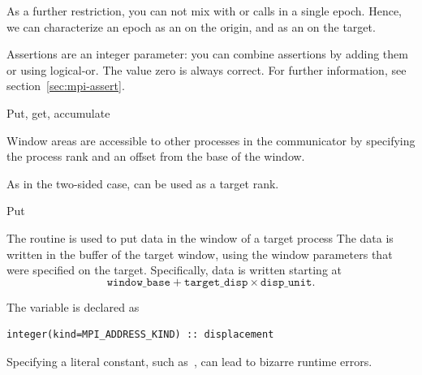 As a further restriction, you can not mix  with  or 
calls in a single epoch. Hence, we can characterize an epoch as an
 on the origin, and
as an  on the target.

Assertions are an integer parameter: you can combine assertions by
adding them or using logical-or.
The value zero is always correct. For further information, see
section~\ref{sec:mpi-assert}.



 {Put, get, accumulate}
\label{sec:putget}

Window areas are 
accessible to other processes in the communicator by specifying the
process rank and an offset from the base of the window.

As in the two-sided case,  can be used as
a target rank.

 {Put}

The  routine is used to put data in the window
of a target process
%
%
The data is written in the buffer of the target window,
using the window parameters that were specified on the target.
Specifically, data is written starting at
\[ \mathtt{window\_base} + \mathtt{target\_disp}\times \mathtt{disp\_unit}. \]

\begin{fortrannote}
  The  variable is declared as 
\lstset{style=reviewcode,language=Fortran}
\begin{lstlisting}
integer(kind=MPI_ADDRESS_KIND) :: displacement
\end{lstlisting}
\lstset{style=reviewcode,language=C}
  Specifying a literal constant, such as~, can lead to bizarre
  runtime errors.
\end{fortrannote}

